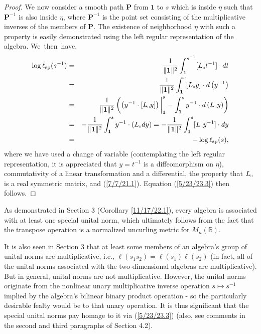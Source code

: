 \documentclass{amsart}
\numberwithin{equation}{section}
\theoremstyle{definition}
\numberwithin{theorem}{section}
\begin{document}
\begin{proof}
We 
\enlargethispage{2cm}
now consider a smooth path $\mathbf{P}$ from $\mathbf{1}$ to $s$ which is inside $\eta$  such that $\mathbf{P}^{-1}$ is also inside $\eta$,  where $\mathbf{P}^{-1}$ is the point set consisting of the multiplicative inverses of the members of $\mathbf{P}$.  The  existence of neighborhood $\eta$ with such a property  is  easily demonstrated using the left regular representation of the algebra.
\mbox{We then have,} \begin{eqnarray}  \log \ell_{\rm sp}(s^{-1})   &=&   \frac{1}{\|{\bf 1}\|^2} \int_{\bf 1}^{s^{-1}} [L_{\shortparallel}t^{-1}] \cdot dt \nonumber \\ &=&  \frac{1}{\|{\bf 1}\|^2} \int_{\bf 1}^s [L_{\shortparallel}y]\cdot d\left(y^{-1}\right) \nonumber \\ &=&  \frac{1}{\|{\bf 1}\|^2}\left(\left(y^{-1}\cdot [L_{\shortparallel}y]\right)\bigg|_{\bf 1}^s - \int_{\bf 1}^s y^{-1}\cdot d\left(L_{\shortparallel}y\right)\right)   \nonumber \\ &=& -\frac{1}{\|{\bf 1}\|^2} \int_{\bf 1}^s y^{-1}\cdot (L_{\shortparallel}dy) = -\frac{1}{\|{\bf 1}\|^2} \int_{\bf 1}^s [L_{\shortparallel}y^{-1}] \cdot dy  \nonumber \\ &=& -\log \ell_{\rm sp}(s),\label{4/2/23.5} \end{eqnarray} where we have used a change of variable (contemplating the left regular representation, it is appreciated that $y=t^{-1}$ is a diffeomorphism on $\eta$), commutativity of a linear transformation and a differential, the property that $L_{\shortparallel}$ is a real symmetric matrix, and  (\ref{7/7/21.1}).  Equation (\ref{5/23/23.3}) then follows.
\end{proof}



As demonstrated in Section 3 (Corollary \ref{11/17/22.1}), every algebra is associated with at least one special unital norm, which ultimately follows from the fact that the transpose operation is a normalized uncurling metric for $M_n(\mathbb{R})$.

It is also seen in Section 3 that at least some members of an algebra's group of unital norms are multiplicative, i.e., $\ell(s_1s_2) = \ell(s_1)\ell(s_2)$ (in fact, all of the unital norms associated with the two-dimensional algebras are multiplicative).   But in general, unital norms are not multiplicative.  However, the unital norms originate from the nonlinear unary multiplicative inverse operation $s\mapsto s^{-1}$ implied by the algebra's bilinear binary product operation - so the particularly desirable fealty would be to that unary operation.  It is thus significant that the special unital norms pay homage to it via (\ref{5/23/23.3}) (also, see comments in the second and third paragraphs of Section 4.2).
\end{document}
